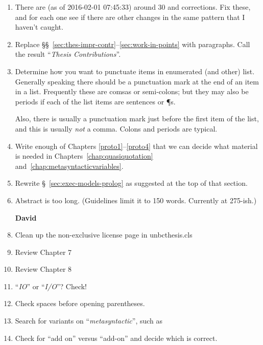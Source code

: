 \begin{scope}
\begin{enumerate}
\item
  There are (as of 2016-02-01 07:45:33) around 30  and  corrections.  Fix these, and
  for each one see if there are other changes in the same pattern that I haven't caught.

\item
  Replace \S\S~\ref{sec:thes-impr-contr}--\ref{sec:work-in-points} with
  paragraphs.  Call the result ``\textsl{Thesis Contributions}''.

\item \label{item:5}
  Determine how you want to punctuate items in enumerated (and other)
  list.
  Generally speaking there should be a punctuation mark at the end of an
  item in a list.
  Frequently these are comsas or semi-colons; but they may also be
  periods if each of the list items are sentences or \P{}s.

  Also, there is usually a punctuation mark just before the first item
  of the list, and this is usually \textit{not} a comma.  Colons and
  periods are typical.

\item
  Write enough of Chapters \ref{proto1}--\ref{proto4} that we can decide
  what material is needed in Chapters~\ref{chap:quasiquotation}
  and~\ref{chap:metasyntacticvariables}.

\item
  Rewrite \S~\ref{sec:exec-models-prolog} as suggested at the top of that section. 

\item
  Abstract is too long.  (Guidelines limit it to 150 words.  Currently
  at 275-ish.)



\item [\textbf{David}]
\item Clean up the non-exclusive license page in unbcthesis.cls
\item Review Chapter 7
\item Review Chapter 8
\item ``\textit{IO}'' or ``\textit{I/O}''?  Check!
\item Check spaces before opening parentheses.
\item Search for variants on ``\textit{metasyntactic}'', such as
\item Check for ``add on'' versus ``add-on'' and decide which is correct.
\end{enumerate}


\end{scope}
